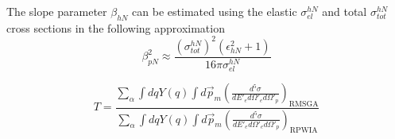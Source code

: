 The slope parameter $\beta_{hN}$ can be estimated using
the elastic $\sigma^{hN}_{el}$ and total $\sigma^{hN}_{tot}$ cross sections
in the following
approximation~\cite{Ryckebusch_2003}
\begin{equation}
    \beta_{p N}^{2} \approx
            \frac{(\sigma^{hN}_{tot})^{2} (\epsilon_{hN}^{2}+1)}
                 {16 \pi \sigma^{hN}_{el}}
\end{equation}



\begin{equation}
    T= \frac{\sum_{\alpha} \int d q Y(q) \int d \vec{p}_{m} \left(\frac{d^5\sigma}{d E'_e d \Omega'_e d \Omega'_p} \right)_{\mathrm{RMSGA}}}
            {\sum_{\alpha} \int d q Y(q) \int d \vec{p}_{m} \left(\frac{d^5\sigma}{d E'_e d \Omega'_e d \Omega'_p} \right)_{\mathrm{RPWIA}}}
\end{equation}

